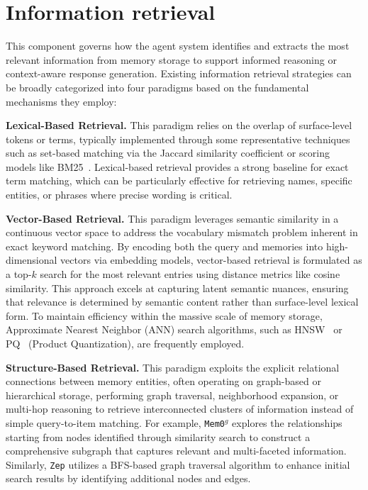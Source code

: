 \section{Information retrieval}
\label{sec:mem_retrieval}

This component governs how the agent system identifies and extracts the most relevant information from memory storage to support informed reasoning or context-aware response generation.
Existing information retrieval strategies can be broadly categorized into four paradigms based on the fundamental mechanisms they employ:

 \textbf{Lexical-Based Retrieval.}
This paradigm relies on the overlap of surface-level tokens or terms, typically implemented through some representative techniques such as set-based matching via the Jaccard similarity coefficient or scoring models like BM25~\cite{robertson2009prf}. Lexical-based retrieval provides a strong baseline for exact term matching, which can be particularly effective for retrieving names, specific entities, or phrases where precise wording is critical.

 \textbf{Vector-Based Retrieval.}
This paradigm leverages semantic similarity in a continuous vector space to address the vocabulary mismatch problem inherent in exact keyword matching. By encoding both the query and memories into high-dimensional vectors via embedding models, vector-based retrieval is formulated as a top-$k$ search for the most relevant entries using distance metrics like cosine similarity. This approach excels at capturing latent semantic nuances, ensuring that relevance is determined by semantic content rather than surface-level lexical form. To maintain efficiency within the massive scale of memory storage, Approximate Nearest Neighbor (ANN) search algorithms, such as HNSW~\cite{malkov2018efficient} or PQ~\cite{jegou2011pq} (Product Quantization), are frequently employed.

 \textbf{Structure-Based Retrieval.}
This paradigm exploits the explicit relational connections between memory entities, often operating on graph-based or hierarchical storage, performing graph traversal, neighborhood expansion, or multi-hop reasoning to retrieve interconnected clusters of information instead of simple query-to-item matching. For example, {\tt Mem0$^g$} explores the relationships starting from nodes identified through similarity search to construct a comprehensive subgraph that captures relevant and multi-faceted information. Similarly, {\tt Zep} utilizes a BFS-based graph traversal algorithm to enhance initial search results by identifying additional nodes and edges.

